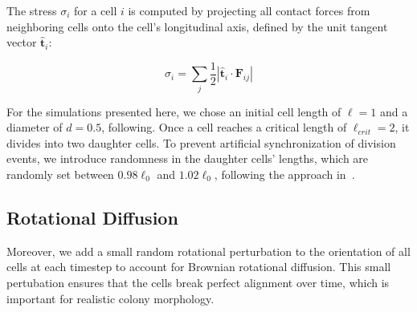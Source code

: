 \documentclass[conference]{IEEEtran}
\begin{document}
The stress $\sigma_i$ for a cell $i$ is computed by projecting all contact forces from neighboring cells onto the cell's longitudinal axis, defined by the unit tangent vector $\hat{\mathbf{t}}_i$:

\begin{equation} \label{eq:stress}
    \sigma_i = \sum_{j} \frac{1}{2} \left| \hat{\mathbf t}_i \cdot \mathbf F_{ij} \right|
\end{equation}

For the simulations presented here, we chose an initial cell length of $\ell = 1$ and a diameter of $d = 0.5$, following. Once a cell reaches a critical length of $\ell_{crit} = 2$, it divides into two daughter cells. To prevent artificial synchronization of division events, we introduce randomness in the daughter cells' lengths, which are randomly set between $0.98\ell_0$ and $1.02\ell_0$, following the approach in~\cite{Khan_2024}.

\subsection{Rotational Diffusion}

Moreover, we add a small random rotational perturbation to the orientation of all cells at each timestep to account for Brownian rotational diffusion. This small pertubation ensures that the cells break perfect alignment over time, which is important for realistic colony morphology.
\end{document}

